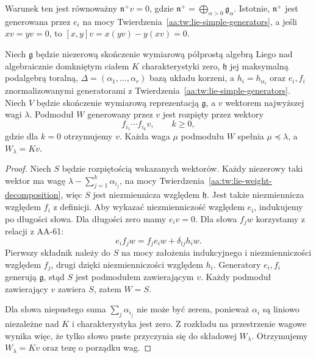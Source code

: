Warunek ten jest równoważny $\mathfrak n^+v=0$, gdzie $\mathfrak n^+=\bigoplus_{\alpha>0}\mathfrak g_\alpha$. Istotnie, $\mathfrak n^+$ jest generowana przez $e_i$ na mocy Twierdzenia~\ref{aa:tw:lie-simple-generators}, a jeśli $xv=yv=0$, to $[x,y]v=x(yv)-y(xv)=0$.

\begin{lemat}
\label{aa:lem:lie-highest-cyclic}
Niech $\mathfrak g$ będzie niezerową skończenie wymiarową półprostą algebrą Liego nad algebraicznie domkniętym ciałem $K$ charakterystyki zero, $\mathfrak h$ jej maksymalną podalgebrą toralną, $\Delta=(\alpha_1,\ldots,\alpha_r)$ bazą układu korzeni, a $h_i=h_{\alpha_i}$ oraz $e_i,f_i$ znormalizowanymi generatorami z Twierdzenia~\ref{aa:tw:lie-simple-generators}. Niech $V$ będzie skończenie wymiarową reprezentacją $\mathfrak g$, a $v$ wektorem najwyższej wagi $\lambda$. Podmoduł $W$ generowany przez $v$ jest rozpięty przez wektory
\[
 f_{i_1}\cdots f_{i_k}v,\qquad k\ge0,
\]
gdzie dla $k=0$ otrzymujemy $v$. Każda waga $\mu$ podmodułu $W$ spełnia $\mu\preceq\lambda$, a $W_\lambda=Kv$.
\end{lemat}
\begin{proof}
Niech $S$ będzie rozpiętością wskazanych wektorów. Każdy niezerowy taki wektor ma wagę $\lambda-\sum_{j=1}^k\alpha_{i_j}$, na mocy Twierdzenia~\ref{aa:tw:lie-weight-decomposition}, więc $S$ jest niezmiennicza względem $\mathfrak h$. Jest także niezmiennicza względem $f_i$ z definicji. Aby wykazać niezmienniczość względem $e_i$, indukujemy po długości słowa. Dla długości zero mamy $e_i v=0$. Dla słowa $f_jw$ korzystamy z relacji z AA-61:
\[
 e_i f_jw=f_j e_iw+\delta_{ij}h_iw.
\]
Pierwszy składnik należy do $S$ na mocy założenia indukcyjnego i niezmienniczości względem $f_j$, drugi dzięki niezmienniczości względem $h_i$. Generatory $e_i,f_i$ generują $\mathfrak g$, stąd $S$ jest podmodułem zawierającym $v$. Każdy podmoduł zawierający $v$ zawiera $S$, zatem $W=S$.

Dla słowa niepustego suma $\sum_j\alpha_{i_j}$ nie może być zerem, ponieważ $\alpha_i$ są liniowo niezależne nad $K$ i charakterystyka jest zero. Z rozkładu na przestrzenie wagowe wynika więc, że tylko słowo puste przyczynia się do składowej $W_\lambda$. Otrzymujemy $W_\lambda=Kv$ oraz tezę o porządku wag.
\end{proof}

